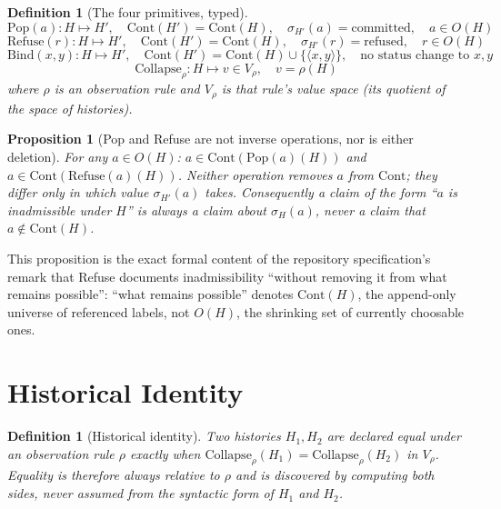 \documentclass[11pt,twoside]{book}
\newtheorem{proposition}[theorem]{Proposition}
\newtheorem{definition}[theorem]{Definition}
\begin{document}
\begin{definition}[The four primitives, typed]
\[
\mathrm{Pop}(a) : H \mapsto H', \quad \mathrm{Cont}(H') = \mathrm{Cont}(H), \quad \sigma_{H'}(a) = \mathrm{committed}, \quad a \in O(H)
\]
\[
\mathrm{Refuse}(r) : H \mapsto H', \quad \mathrm{Cont}(H') = \mathrm{Cont}(H), \quad \sigma_{H'}(r) = \mathrm{refused}, \quad r \in O(H)
\]
\[
\mathrm{Bind}(x,y) : H \mapsto H', \quad \mathrm{Cont}(H') = \mathrm{Cont}(H) \cup \{\langle x,y \rangle\}, \quad \text{no status change to } x, y
\]
\[
\mathrm{Collapse}_\rho : H \mapsto v \in V_\rho, \quad v = \rho(H)
\]
where $\rho$ is an observation rule and $V_\rho$ is that rule's value space (its quotient of the space of histories).
\end{definition}

\begin{proposition}[Pop and Refuse are not inverse operations, nor is either deletion]
For any $a \in O(H)$: $a \in \mathrm{Cont}(\mathrm{Pop}(a)(H))$ and $a \in \mathrm{Cont}(\mathrm{Refuse}(a)(H))$. Neither operation removes $a$ from $\mathrm{Cont}$; they differ only in which value $\sigma_{H'}(a)$ takes. Consequently a claim of the form ``$a$ is inadmissible under $H$'' is always a claim about $\sigma_H(a)$, never a claim that $a \notin \mathrm{Cont}(H)$.
\end{proposition}

This proposition is the exact formal content of the repository specification's remark that Refuse documents inadmissibility ``without removing it from what remains possible'': ``what remains possible'' denotes $\mathrm{Cont}(H)$, the append-only universe of referenced labels, not $O(H)$, the shrinking set of currently choosable ones.

\section{Historical Identity}

\begin{definition}[Historical identity]
Two histories $H_1, H_2$ are declared equal under an observation rule $\rho$ exactly when $\mathrm{Collapse}_\rho(H_1) = \mathrm{Collapse}_\rho(H_2)$ in $V_\rho$. Equality is therefore always relative to $\rho$ and is discovered by computing both sides, never assumed from the syntactic form of $H_1$ and $H_2$.
\end{definition}
\end{document}
